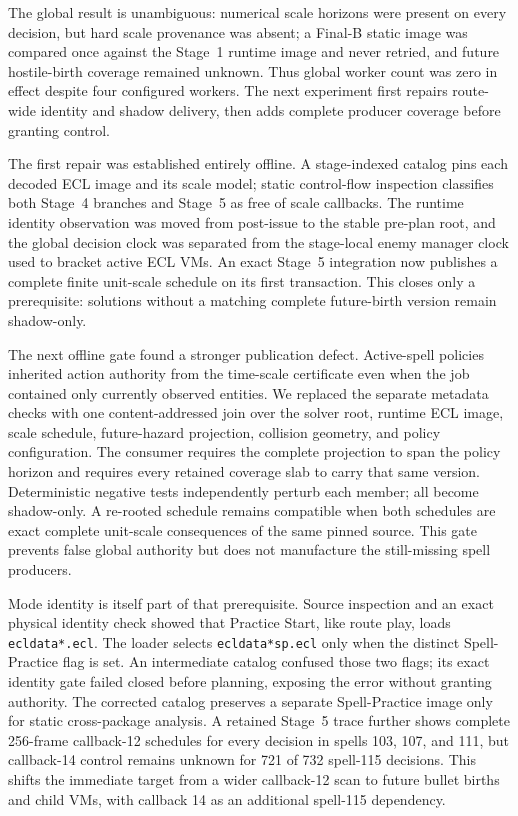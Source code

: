 \documentclass[10pt]{article}
\begin{document}
The global result is unambiguous: numerical scale horizons were present on
every decision, but hard scale provenance was absent; a Final-B static image
was compared once against the Stage~1 runtime image and never retried, and
future hostile-birth coverage remained unknown.  Thus global worker count was
zero in effect despite four configured workers.  The next experiment first
repairs route-wide identity and shadow delivery, then adds complete producer
coverage before granting control.

The first repair was established entirely offline.  A stage-indexed catalog
pins each decoded ECL image and its scale model; static control-flow inspection
classifies both Stage~4 branches and Stage~5 as free of scale callbacks.  The
runtime identity observation was moved from post-issue to the stable pre-plan
root, and the global decision clock was separated from the stage-local enemy
manager clock used to bracket active ECL VMs.  An exact Stage~5 integration now
publishes a complete finite unit-scale schedule on its first transaction.
This closes only a prerequisite: solutions without a matching complete
future-birth version remain shadow-only.

The next offline gate found a stronger publication defect.  Active-spell
policies inherited action authority from the time-scale certificate even when
the job contained only currently observed entities.  We replaced the separate
metadata checks with one content-addressed join over the solver root, runtime
ECL image, scale schedule, future-hazard projection, collision geometry, and
policy configuration.  The consumer requires the complete projection to span
the policy horizon and requires every retained coverage slab to carry that
same version.  Deterministic negative tests independently perturb each member;
all become shadow-only.  A re-rooted schedule remains compatible when both
schedules are exact complete unit-scale consequences of the same pinned
source.  This gate prevents false global authority but does not manufacture
the still-missing spell producers.

Mode identity is itself part of that prerequisite.  Source inspection and an
exact physical identity check showed that Practice Start, like route play,
loads \texttt{ecldata*.ecl}.  The loader selects
\texttt{ecldata*sp.ecl} only when the distinct Spell-Practice flag is set.
An intermediate catalog confused those two flags; its exact identity gate
failed closed before planning, exposing the error without granting authority.
The corrected catalog preserves a separate Spell-Practice image only for
static cross-package analysis.  A retained Stage~5 trace further shows
complete 256-frame callback-12 schedules for every
decision in spells 103, 107, and 111, but callback-14 control remains unknown
for 721 of 732 spell-115 decisions.  This shifts the immediate target from a
wider callback-12 scan to future bullet births and child VMs, with callback 14
as an additional spell-115 dependency.
\end{document}
